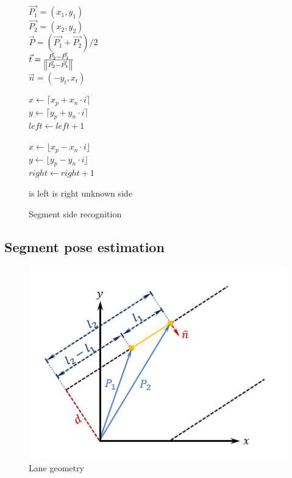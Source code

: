 \documentclass{article}
\begin{document}
\begin{figure} [ht]
\begin{algorithm}[H]
	$\vec{P_1} = (x_1, y_1)$
	\\
	$\vec{P_2} = (x_2, y_2)$
	\\
	$\vec{P} = (\vec{P_1} + \vec{P_2}) / 2$
	\\
	$\vec{t} = \frac{\vec{P_2} - \vec{P_1}}
					{\norm{\vec{P_2} - \vec{P_1}}}$
	\\
	$\vec{n} = (-y_t, x_t)$
	\\
	 {
		$x \gets \lceil x_p + x_n \cdot i \rceil$
		\\
		$y \gets \lceil y_p + y_n \cdot i \rceil$
		\\		
			{
				$left \gets left + 1$ 
			}
			
		$x \gets \lfloor x_p - x_n \cdot i \rfloor$
		\\
		$y \gets \lfloor y_p - y_n \cdot i \rfloor$
		\\		
			{
				$right \gets right + 1$ 
			}
	}
	
		{
			\Return is left
		}
		{
			\Return is right
		}
	\uElse
		{
			\Return unknown side
		} 
	\caption{Segment side recognition}
\end{algorithm}
\end{figure}
\FloatBarrier

\subsection{Segment pose estimation}

\begin{figure}[ht]
  \label{fig:lane_geometry}
  \centering
  \includegraphics[scale=1]{graphs/lane_geometry.PNG}
  \caption{Lane geometry}
\end{figure}
\FloatBarrier
\end{document}

